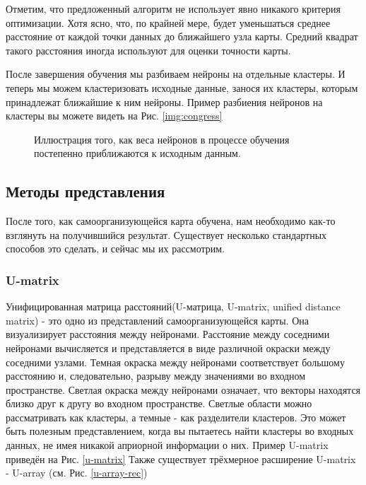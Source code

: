 \documentclass[a4paper,12pt]{article}
\begin{document}
Отметим, что предложенный алгоритм не использует явно никакого критерия оптимизации. Хотя ясно, что, по крайней мере, будет уменьшаться среднее расстояние от каждой точки данных до ближайшего узла карты. Средний квадрат такого расстояния иногда используют для оценки точности карты.\cite{zinovyevbook}

После завершения обучения мы разбиваем нейроны на отдельные кластеры. И теперь мы можем кластеризовать исходные данные, занося их кластеры, которым принадлежат ближайшие к ним нейроны. Пример разбиения нейронов на кластеры вы можете видеть на Рис. \ref{img:congress}

\begin{figure}[H]
  \centering
  \def\svgwidth{\textwidth}
  
  \caption{Иллюстрация того, как веса нейронов в процессе обучения постепенно приближаются к исходным данным.}
  \label{somtraining}
\end{figure}

\subsection{Методы представления}

После того, как самоорганизующейся карта обучена, нам необходимо как-то взглянуть на получившийся результат. Существует несколько стандартных способов это сделать, и сейчас мы их рассмотрим.

\subsubsection{U-matrix}

Унифицированная матрица расстояний(U-матрица, U-matrix, unified distance matrix) - это одно из представлений самоорганизующейся карты. Она визуализирует расстояния между нейронами. Расстояние между соседними нейронами вычисляется и представляется в виде различной окраски между соседними узлами. Темная окраска между нейронами соответствует большому расстоянию и, следовательно, разрыву между значениями во входном пространстве. Светлая окраска между нейронами означает, что векторы находятся близко друг к другу во входном пространстве. Светлые области можно рассматривать как кластеры, а темные - как разделители кластеров. Это может быть полезным представлением, когда вы пытаетесь найти кластеры во входных данных, не имея никакой априорной информации о них.\cite{u_matrix} Пример U-matrix приведён на Рис. \ref{u-matrix} Также существует трёхмерное расширение U-matrix - U-array (см. Рис. \ref{u-array-rec}) 
\end{document}
